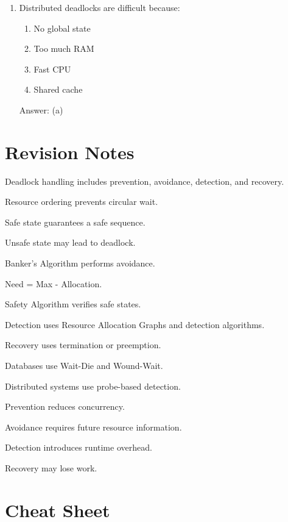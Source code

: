 \begin{enumerate}
\item Distributed deadlocks are difficult because:
\begin{enumerate}[label=(\alph*)]
\item No global state
\item Too much RAM
\item Fast CPU
\item Shared cache
\end{enumerate}
Answer: (a)
\end{enumerate}

\section{Revision Notes}

\begin{revisionnotes}
\item Deadlock handling includes prevention, avoidance, detection, and recovery.
\item Resource ordering prevents circular wait.
\item Safe state guarantees a safe sequence.
\item Unsafe state may lead to deadlock.
\item Banker's Algorithm performs avoidance.
\item Need = Max - Allocation.
\item Safety Algorithm verifies safe states.
\item Detection uses Resource Allocation Graphs and detection algorithms.
\item Recovery uses termination or preemption.
\item Databases use Wait-Die and Wound-Wait.
\item Distributed systems use probe-based detection.
\item Prevention reduces concurrency.
\item Avoidance requires future resource information.
\item Detection introduces runtime overhead.
\item Recovery may lose work.
\end{revisionnotes}

\section{Cheat Sheet}

